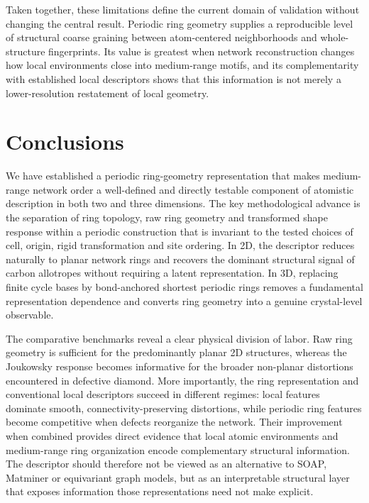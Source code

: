 \documentclass[twoside,twocolumn,9pt]{article}
\begin{document}
Taken together, these limitations define the current domain of validation without changing the central result. Periodic ring geometry supplies a reproducible level of structural coarse graining between atom-centered neighborhoods and whole-structure fingerprints. Its value is greatest when network reconstruction changes how local environments close into medium-range motifs, and its complementarity with established local descriptors shows that this information is not merely a lower-resolution restatement of local geometry.


\section*{Conclusions}

We have established a periodic ring-geometry representation that makes medium-range network order a well-defined and directly testable component of atomistic description in both two and three dimensions. The key methodological advance is the separation of ring topology, raw ring geometry and transformed shape response within a periodic construction that is invariant to the tested choices of cell, origin, rigid transformation and site ordering. In 2D, the descriptor reduces naturally to planar network rings and recovers the dominant structural signal of carbon allotropes without requiring a latent representation. In 3D, replacing finite cycle bases by bond-anchored shortest periodic rings removes a fundamental representation dependence and converts ring geometry into a genuine crystal-level observable.

The comparative benchmarks reveal a clear physical division of labor. Raw ring geometry is sufficient for the predominantly planar 2D structures, whereas the Joukowsky response becomes informative for the broader non-planar distortions encountered in defective diamond. More importantly, the ring representation and conventional local descriptors succeed in different regimes: local features dominate smooth, connectivity-preserving distortions, while periodic ring features become competitive when defects reorganize the network. Their improvement when combined provides direct evidence that local atomic environments and medium-range ring organization encode complementary structural information. The descriptor should therefore not be viewed as an alternative to SOAP, Matminer or equivariant graph models, but as an interpretable structural layer that exposes information those representations need not make explicit.
\end{document}
